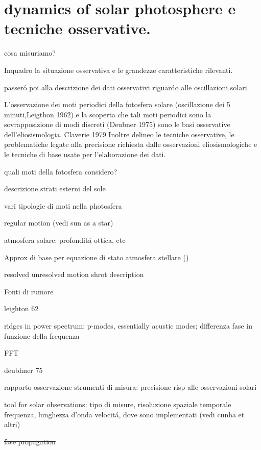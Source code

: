 \documentclass[oneside,12pt,fleqn]{memoir}
\begin{document}
\section{dynamics of solar photosphere e tecniche osservative.}

cosa misuriamo?

Inquadro la situazione osservativa e le grandezze caratteristiche rilevanti.

passer\'o poi alla descrizione dei dati osservativi riguardo alle oscillazioni solari.

L'osservazione dei moti periodici della fotosfera solare (oscillazione dei 5 minuti,Leigthon 1962) e la scoperta che tali moti periodici sono la sovrapposizione di modi discreti (Deubner 1975) sono le basi osservative dell'eliosismologia. Claverie 1979
Inoltre delineo le tecniche osservative, le problematiche legate alla precisione richiesta dalle osservazioni eliosismologiche e le tecniche di base usate per l'elaborazione dei dati.
 
\begin{itemize*}
\item quali moti della fotosfera considero?
\item descrizione strati esterni del sole
\item vari tipologie di moti nella photosfera
\item regular motion (vedi sun as a star)
\item atmosfera solare: profondit\'a ottica, etc
\item Approx di base per equazione di stato atmosfera stellare (\cite{ste74waves})
\item resolved unresolved motion shrot description
\item Fonti di rumore
\item leighton 62 \cite{lei62velocity}
\item ridges in power spectrum: p-modes, essentially acustic modes; differenza fase in funzione della frequenza
\item FFT
\item deubhner 75 \cite{deu75observations}
\item rapporto osservazione strumenti di misura: precisione risp alle osservazioni solari
\item tool for solar observations: tipo di misure, risoluzione spaziale temporale frequenza, lunghezza d'onda velocit\'a, dove sono implementati (vedi cunha et altri)

\item \sout{fase propagation}
\end{itemize*}
\end{document}
